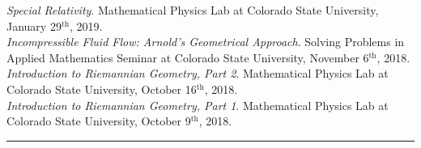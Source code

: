 \documentclass[12pt]{article} %
\begin{document}
\begin{flushleft}
    \vspace*{5pt}
    \emph{Special Relativity}. Mathematical Physics Lab at Colorado State University, January 29$^\textrm{th}$, 2019.\\
    \vspace*{5pt}
    \emph{Incompressible Fluid Flow: Arnold's Geometrical Approach}. Solving Problems in Applied Mathematics Seminar at Colorado State University, November 6$^\textrm{th}$, 2018.\\
    \vspace*{5pt}
    \emph{Introduction to Riemannian Geometry, Part 2}. Mathematical Physics Lab at Colorado State University, October 16$^\textrm{th}$, 2018.\\
    \vspace*{5pt}
    \emph{Introduction to Riemannian Geometry, Part 1}. Mathematical Physics Lab at Colorado State University, October 9$^\textrm{th}$, 2018.
\end{flushleft}


\rule{\textwidth}{0.5mm}
\end{document}
